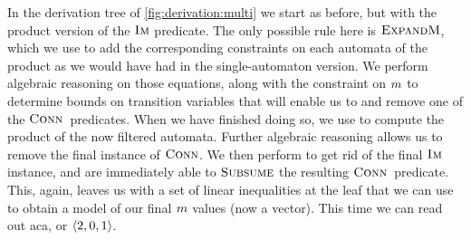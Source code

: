 \documentclass[acmsmall,review,anonymous,screen]{acmart}\settopmatter{printfolios=true,printccs=true,printacmref=true}
\theoremstyle{definition}
\begin{document}
In the derivation tree of \cref{fig:derivation:multi} we start as before, but
with the product version of the $\operatorname{\textsc{Im}}$ predicate. The only possible rule here
is $\textsc{ExpandM}$, which we use to add the corresponding constraints on each
automata of the product as we would have had in the single-automaton version. We
perform algebraic reasoning on those equations, along with the constraint on
$m$ to determine bounds on transition variables that will enable us
to \Subsume{} and remove one of the $\operatorname{\textsc{Conn}}{}$ predicates. When we have
finished doing so, we use \Materialise{} to compute the product of the now
filtered automata. Further algebraic reasoning allows us to remove the final
instance of $\operatorname{\textsc{Conn}}$. We then perform \Expand{} to get rid of the final
$\operatorname{\textsc{Im}}$ instance, and are immediately able to $\textsc{Subsume}$ the resulting
$\operatorname{\textsc{Conn}}{}$ predicate. This, again, leaves us with a set of linear
inequalities at the leaf that we can use to obtain a model of our final
$m$ values (now a vector). This time we can read out aca, or
$\left\langle2, 0, 1\right\rangle$.
\end{document}
